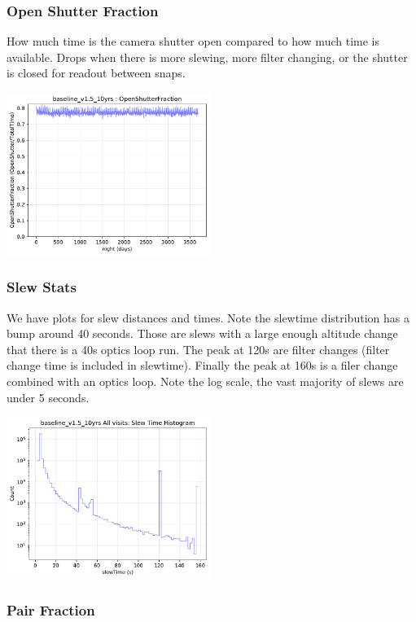 {\subsubsection{Open Shutter Fraction}

How much time is the camera shutter open compared to how much time is available. Drops when there is more slewing, more filter changing, or the shutter is closed for readout between snaps.

\includegraphics[width=0.5\textwidth]{metric_summary/baseline_v1.5_10yrs/baseline_v1_5_10yrs_OpenShutterFraction_ONED_BinnedData.pdf}

\subsubsection{Slew Stats}

We have plots for slew distances and times. Note the slewtime distribution has a bump around 40 seconds. Those are slews with a large enough altitude change that there is a 40s optics loop run. The peak at 120s are filter changes (filter change time is included in slewtime). Finally the peak at 160s is a filer change combined with an optics loop. Note the log scale, the vast majority of slews are under 5 seconds.

\includegraphics[width=0.5\textwidth]{metric_summary/baseline_v1.5_10yrs/baseline_v1_5_10yrs_Slew_Time_Histogram_All_visits_ONED_BinnedData.pdf}

\subsubsection{Pair Fraction}

}
